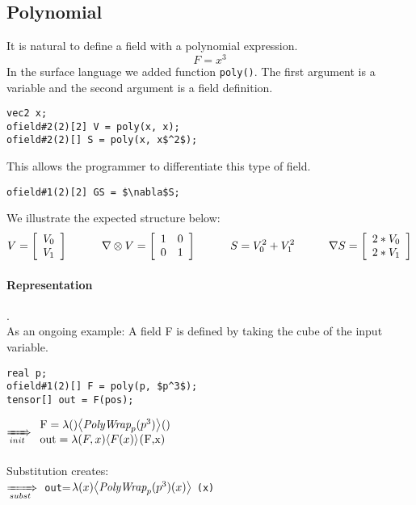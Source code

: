 \subsection{Polynomial}
It is natural to define a field with a polynomial expression. $$F = x^3$$
In the surface language we added function \lstinline[mathescape=true]!poly()!.
The first argument is a variable and the second argument is a field definition.
\begin{lstlisting}[mathescape=true]
vec2 x;
ofield#2(2)[2] V = poly(x, x);
ofield#2(2)[] S = poly(x, x$^2$);
\end{lstlisting}
This allows the programmer to differentiate this type of field.
\begin{lstlisting}[mathescape=true]
ofield#1(2)[2] GS = $\nabla$S;
\end{lstlisting}
We illustrate the expected structure below:
\begin{displaymath}
  V=\left[ \begin{array}{ll}
  V_0 \\  V_1  \\
  \end{array}
 \right]   \indent\indent 
  \nabla \otimes V=\left[ \begin{array}{ll}
 1&   0 \\  0  &  1  \\
  \end{array}
 \right]   \indent\indent 
   S=  V_0 ^2+  V_1^2  \\
  \indent\indent
    \nabla S=\left[ \begin{array}{ll}
  2*V_0 \\  2*V_1  \\
  \end{array}
 \right] 
 \end{displaymath}

\paragraph{Representation}.\\
As an ongoing example:
A field F is defined by taking the cube of the input variable.\begin{lstlisting}[mathescape=true]
real p; 
ofield#1(2)[] F = poly(p, $p^3$);
tensor[] out = F(pos);
\end{lstlisting}

$\rewriteInitA \begin{array}{ll} \lstinline[mathescape=true]!F!=\lambda ()\EinExp{\expPolyWrap{p}{{p}^3}}{}()\\
\lstinline[mathescape=true]!out!=\lambda(F,x) \EinExp{F(x)}{}\lstinline[mathescape=true]!(F,x)!\end{array}$\\
\\
Substitution creates:\\
$\xRightarrow[subst]{}{}$ \lstinline[mathescape=true]!out!=$\lambda(x) {\left\langle{\textit{PolyWrap}_{p}({p^3})(x)}\right\rangle}_{}$
\lstinline[mathescape=true]!(x)!
